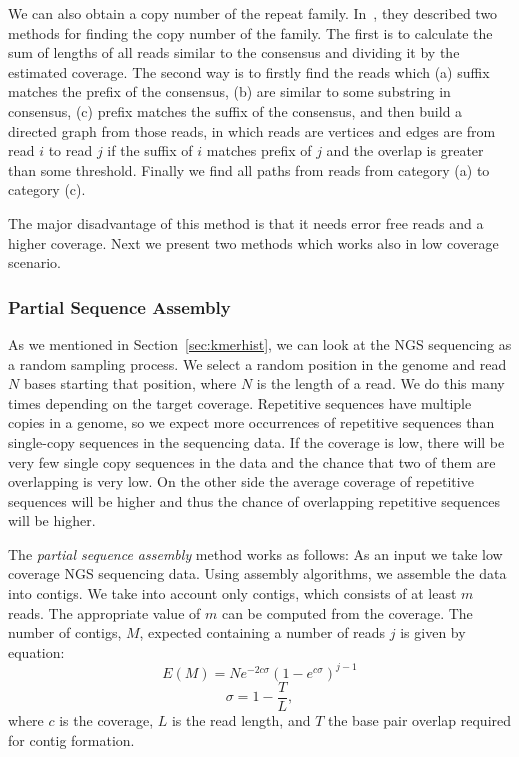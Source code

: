 We can also obtain a copy number of the repeat family. In~\cite{waterman}, they described two methods for finding the copy number of the family.
The first is to calculate the sum of lengths of all reads similar to the consensus and dividing it by the estimated coverage.
The second way is to firstly find the reads which (a) suffix matches the prefix of the consensus, (b) are similar to some substring in consensus, (c) prefix matches the suffix of the consensus, and then build a directed graph from those reads, in which reads are vertices and edges are from read $i$ to read $j$ if the suffix of $i$ matches prefix of $j$ and the overlap is greater than some threshold. Finally we find all paths from reads from category (a) to category (c).

The major disadvantage of this method is that it needs error free reads and a higher coverage.
Next we present two methods which works also in low coverage scenario.

\subsubsection{Partial Sequence Assembly}

As we mentioned in Section~\ref{sec:kmerhist}, we can look at the NGS sequencing as a random sampling process. We select a random position in the genome and read $N$ bases starting that position, where $N$ is the length of a read. We do this many times depending on the target coverage.
Repetitive sequences have multiple copies in a genome, so we expect more occurrences of repetitive sequences than single-copy sequences in the sequencing data. If the coverage is low, there will be very few single copy sequences in the data and the chance that two of them are overlapping is very low. On the other side the average coverage of repetitive sequences will be higher and thus the chance of overlapping repetitive sequences will be higher.

The \emph{partial sequence assembly} method works as follows: As an input we take low coverage NGS sequencing data. Using assembly algorithms, we assemble the data into contigs. We take into account only contigs, which consists of at least $m$ reads. The appropriate value of $m$ can be computed from the coverage. The number of contigs, $M$, expected containing a number of reads $j$ is given by equation\cite{swaminathan2007global}:
$$E(M) = Ne^{-2c\sigma}{(1-e^{c\sigma})}^{j-1}$$
$$\sigma = 1 - \frac{T}{L},$$
where $c$ is the coverage, $L$ is the read length, and $T$ the base pair overlap required for contig formation.


